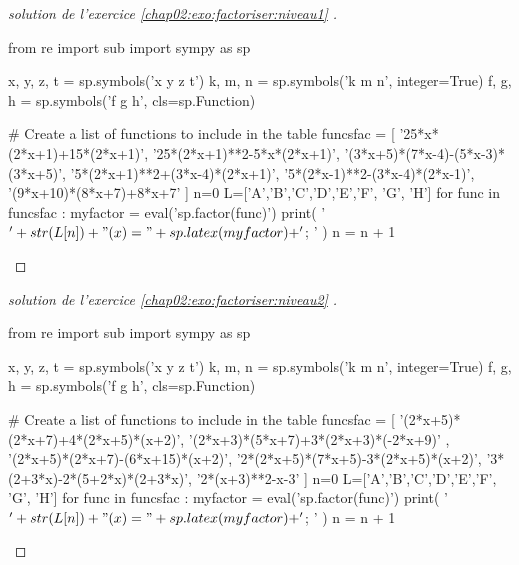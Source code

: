 \begin{proof}[solution de l'exercice \ref{chap02:exo:factoriser:niveau1} ]   
\begin{pycode}
from re import sub
import sympy as sp

x, y, z, t = sp.symbols('x y z t')
k, m, n = sp.symbols('k m n', integer=True)
f, g, h = sp.symbols('f g h', cls=sp.Function)

# Create a list of functions to include in the table
funcsfac = [ 
'25*x*(2*x+1)+15*(2*x+1)',  
'25*(2*x+1)**2-5*x*(2*x+1)',   
'(3*x+5)*(7*x-4)-(5*x-3)*(3*x+5)', 
'5*(2*x+1)**2+(3*x-4)*(2*x+1)',  
'5*(2*x-1)**2-(3*x-4)*(2*x-1)',
'(9*x+10)*(8*x+7)+8*x+7'
]
n=0
L=['A','B','C','D','E','F', 'G', 'H']
for func in funcsfac :  
	myfactor =  eval('sp.factor(func)')
	print( '$'+ str(L[n])  + "(x)=" + sp.latex(myfactor) + '$; ' ) 
	n     = n + 1
\end{pycode}
\end{proof}
\begin{proof}[solution de l'exercice \ref{chap02:exo:factoriser:niveau2} ]  
\begin{pycode}
from re import sub
import sympy as sp

x, y, z, t = sp.symbols('x y z t')
k, m, n = sp.symbols('k m n', integer=True)
f, g, h = sp.symbols('f g h', cls=sp.Function)

# Create a list of functions to include in the table
funcsfac = [ '(2*x+5)*(2*x+7)+4*(2*x+5)*(x+2)',
'(2*x+3)*(5*x+7)+3*(2*x+3)*(-2*x+9)'  ,
'(2*x+5)*(2*x+7)-(6*x+15)*(x+2)',
'2*(2*x+5)*(7*x+5)-3*(2*x+5)*(x+2)',
'3*(2+3*x)-2*(5+2*x)*(2+3*x)',
'2*(x+3)**2-x-3'
]
n=0
L=['A','B','C','D','E','F', 'G', 'H']
for func in funcsfac :  
	myfactor =  eval('sp.factor(func)')
	print( '$'+ str(L[n])  + "(x)=" + sp.latex(myfactor) + '$; ' ) 
	n     = n + 1
\end{pycode}
\end{proof}
%	

